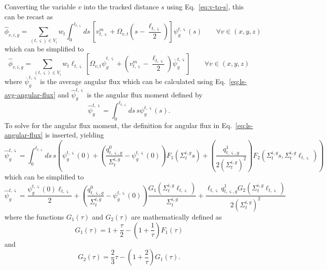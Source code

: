 Converting the variable $v$ into the tracked distance $s$ using Eq.~\ref{eq:v-to-s}, this can be recast as
\begin{equation}
\hat{\phi}_{v,i,g} = \sum_{(t,\varsigma) \in V_i} w_t \int_{0}^{\ell_{t,\varsigma}} ds \, \left[v^m_{t,\varsigma} + \Omega_{v,t} \left(s - \frac{\ell_{t,\varsigma}}{2} \right) \right] \psi^{t,\varsigma}_g(s) \qquad \forall v \in (x,y,z)
\end{equation}
which can be simplified to
\begin{equation}
\hat{\phi}_{v,i,g} = \sum_{(t,\varsigma) \in V_i} w_t \ell_{t,\varsigma} \left[\Omega_{v,t} \hat{\psi}^{t,\varsigma}_g +  \left( v^m_{t,\varsigma} - \frac{\ell_{t,\varsigma}}{2} \right) \overline{\psi}^{t,\varsigma}_g \right] \qquad \forall v \in (x,y,z)
\end{equation}
where $\overline{\psi}^{t,\varsigma}_g$ is the average angular flux which can be calculated using Eq.~\ref{eq:ls-avg-angular-flux} and $ \hat{\psi}^{t,\varsigma}_g$ is the angular flux moment defined by
\begin{equation}
 \hat{\psi}^{t,\varsigma}_g = \int_{0}^{\ell_{t,\varsigma}} ds \, s \psi^{t,\varsigma}_g(s).
\end{equation}
To solve for the angular flux moment, the definition for angular flux in Eq.~\ref{eq:ls-angular-flux} is inserted, yielding
\begin{equation}
\hat{\psi}^{t,\varsigma}_g = \int_{0}^{\ell_{t,\varsigma}} ds \, s \left(\psi^{t,\varsigma}_g(0) + \left( \frac{q^0_{t,\varsigma,g}}{\Sigma_{t}^{i,g}} - \psi_g^{t,\varsigma}(0) \right) F_1\left(\Sigma_{t}^{i,g} s \right) + \left(\frac{q^1_{t,\varsigma,g}}{2\left(\Sigma_{t}^{i,g}\right)^2}\right) F_2\left(\Sigma_{t}^{i,g} s, \Sigma_{t}^{i,g} \ell_{t,\varsigma} \right)\right)
\end{equation}
which can be simplified to
\begin{equation}
\hat{\psi}^{t,\varsigma}_g = \frac{\psi^{t,\varsigma}_g(0) \ell_{t,\varsigma}}{2} + \left(\frac{q^0_{t,\varsigma,g}}{\Sigma_{t}^{i,g}} - \psi^{t,\varsigma}_g(0) \right) \frac{G_1(\Sigma_{t}^{i,g} \ell_{t,\varsigma})}{\Sigma_{t}^{i,g}} + \frac{\ell_{t,\varsigma} q^1_{t,\varsigma,g} G_2(\Sigma_{t}^{i,g} \ell_{t,\varsigma})}{2\left(\Sigma_{t}^{i,g}\right)^2}
\end{equation}
where the functions $G_1(\tau)$ and $G_2(\tau)$ are mathematically defined as
\begin{equation}
G_1(\tau) = 1 + \frac{\tau}{2} - \left(1 + \frac{1}{\tau}\right) F_1(\tau)
\end{equation}
and
\begin{equation}
G_2(\tau) = \frac{2}{3} \tau - \left(1 + \frac{2}{\tau}\right) G_1(\tau).
\end{equation}

